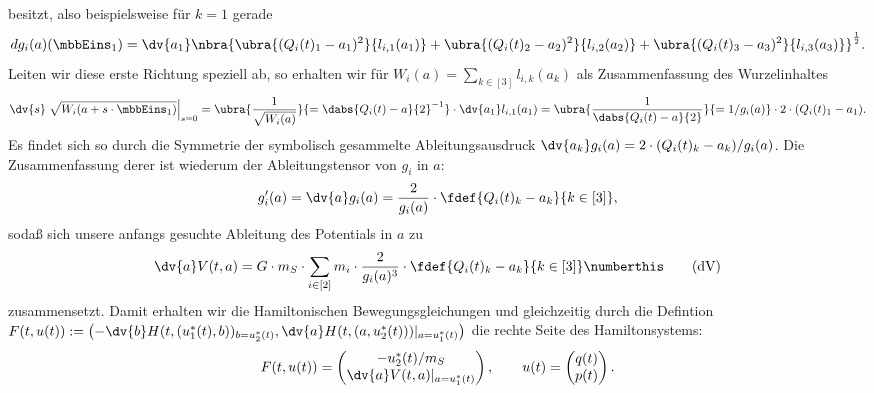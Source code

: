 \documentclass{subfiles}
\begin{document}
    besitzt, also beispielsweise für $k=1$ gerade
    \[
        dg_i(a)(\mbbEins_1) = \dv{a_1}\nbra{\ubra{(Q_i(t)_1 - a_1)^2}{l_{i,1}(a_1)} + \ubra{(Q_i(t)_2 - a_2)^2}{l_{i,2}(a_2)} + \ubra{(Q_i(t)_3 - a_3)^2}{l_{i,3}(a_3)}}^{\frac12}.
    \]
    Leiten wir diese erste Richtung speziell ab, so erhalten wir für $W_i(a) = \sum_{k\in[3]}l_{i,k}(a_k)$ als Zusammenfassung des Wurzelinhaltes
    \[
        \dv{s}\left.\sqrt{W_i(a + s\cdot\mbbEins_1)}\right|_{s=0} = \ubra{\frac{1}{\sqrt{W_i(a)}}}{=\dabs{Q_i(t) - a}{2}^{-1}}\cdot\dv{a_1}l_{i,1}(a_1) = \ubra{\frac{1}{\dabs{Q_i(t) - a}{2}}}{= 1/g_i(a)}\cdot 2\cdot (Q_i(t)_1 - a_1). 
    \]
    Es findet sich so durch die Symmetrie der symbolisch gesammelte Ableitungsausdruck $\dv{a_k}g_i(a) = 2\cdot (Q_i(t)_k - a_k) / g_i(a)$. Die Zusammenfassung derer ist wiederum der Ableitungstensor von $g_i$ in $a$:
    \[
        g_i'(a) = \dv{a}g_i(a) = \frac{2}{g_i(a)}\cdot\fdef{Q_i(t)_k - a_k}{k\in[3]},
    \]
    sodaß sich unsere anfangs gesuchte Ableitung des Potentials in $a$ zu 
    \[
        \dv{a}V(t,a) = G\cdot m_S\cdot\sum_{i\in[2]}m_i\cdot\frac{2}{g_i(a)^3}\cdot\fdef{Q_i(t)_k - a_k}{k\in[3]}\numberthis\label{eq:dV}\tag{dV}
    \]
    zusammensetzt. Damit erhalten wir die Hamiltonischen Bewegungsgleichungen und gleichzeitig durch die Defintion $F(t,u(t)):=\bigl(-\dv{b}H(t,(u_1^*(t),b))_{b=u_2^*(t)},\dv{a}H(t,(a,u_2^*(t)))|_{a=u_1^*(t)}\bigr)$ die rechte Seite des Hamiltonsystems:
    \begin{align*}
        F(t,u(t)) = \begin{pmatrix}
            -u_2^*(t)/m_S\\
            \dv{a}V(t,a)|_{a=u_1^* (t)}
        \end{pmatrix}, \qquad u(t) = \begin{pmatrix}
            q(t)\\
            p(t)
        \end{pmatrix}.
    \end{align*}
\end{document}
